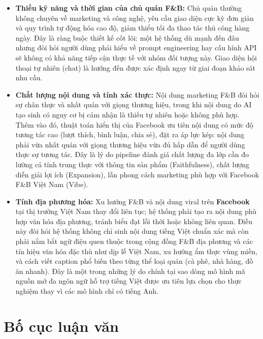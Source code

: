 \begin{itemize}
\item
  \textbf{Thiếu kỹ năng và thời gian của chủ quán F\&B:}
  Chủ quán thường không chuyên về marketing và công nghệ, yêu cầu giao
  diện cực kỳ đơn giản và quy trình tự động hóa cao độ, giảm thiểu tối
  đa thao tác thủ công hàng ngày. Đây là ràng buộc thiết kế cốt lõi:
  một hệ thống dù mạnh đến đâu nhưng đòi hỏi người dùng phải hiểu về
  prompt engineering hay cấu hình API sẽ không có khả năng tiếp cận
  thực tế với nhóm đối tượng này. Giao diện hội thoại tự nhiên (chat)
  là hướng đến được xác định ngay từ giai đoạn khảo sát nhu cầu.

\item
  \textbf{Chất lượng nội dung và tính xác thực:}
  Nội dung marketing F\&B đòi hỏi sự chân thực và nhất quán với giọng
  thương hiệu, trong khi nội dung do AI tạo sinh có nguy cơ bị cảm nhận
  là thiếu tự nhiên hoặc không phù hợp. Thêm vào đó, thuật toán hiển
  thị của Facebook ưu tiên nội dung có mức độ tương tác cao (lượt thích,
  bình luận, chia sẻ), đặt ra áp lực kép: nội dung phải vừa nhất quán
  với giọng thương hiệu vừa đủ hấp dẫn để người dùng thực sự tương tác.
  Đây là lý do pipeline đánh giá chất lượng đa lớp cần đo lường cả tính
  trung thực với thông tin sản phẩm (Faithfulness), chất lượng diễn giải
  lợi ích (Expansion), lẫn phong cách marketing phù hợp với Facebook
  F\&B Việt Nam (Vibe).

\item
  \textbf{Tính địa phương hóa:}
  Xu hướng F\&B và nội dung viral trên \textbf{Facebook} tại thị trường
  Việt Nam thay đổi liên tục; hệ thống phải tạo ra nội dung phù hợp văn
  hóa địa phương, tránh biểu đạt lỗi thời hoặc không liên quan. Điều
  này đòi hỏi hệ thống không chỉ sinh nội dung tiếng Việt chuẩn xác mà
  còn phải nắm bắt ngữ điệu quen thuộc trong cộng đồng F\&B địa phương
  và các tín hiệu văn hóa đặc thù như dịp lễ Việt Nam, xu hướng ẩm
  thực vùng miền, và cách viết caption phổ biến theo từng thể loại quán
  (cà phê, nhà hàng, đồ ăn nhanh). Đây là một trong những lý do chính
  tại sao dòng mô hình mã nguồn mở đa ngôn ngữ hỗ trợ tiếng Việt được
  ưu tiên lựa chọn cho thực nghiệm thay vì các mô hình chỉ có tiếng Anh.
\end{itemize}

\section{Bố cục luận văn}\label{sec:bo-cuc}

